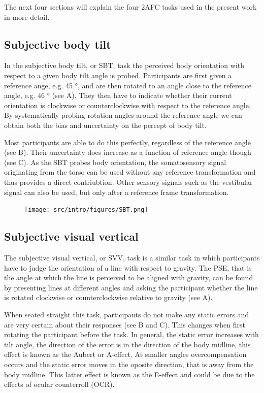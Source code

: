 The next four sections will explain the four 2AFC tasks used in the present work in more detail.

\subsection{Subjective body tilt}
In the subjective body tilt, or SBT, task the perceived body orientation with respect to a given body tilt angle is probed. Participants are first given a reference ange, e.g. 45 \si{\degree}, and are then rotated to an angle close to the reference angle, e.g. 46 \si{\degree} (see A). They then have to indicate whether their current orientation is clockwise or counterclockwise with respect to the reference angle. By systematically probing rotation angles around the reference angle we can obtain both the bias and uncertainty on the percept of body tilt.

Most participants are able to do this perfectly, regardless of the reference angle (see B). Their uncertainty does increase as a function of reference angle though (see C).
As the SBT probes body orientation, the somatosensory signal originating from the torso can be used without any reference transformation and thus provides a direct contriubtion. Other sensory signals such as the vestibular signal can also be used, but only after a reference frame transformation.

\begin{figure}
    \texttt{[image: src/intro/figures/SBT.png]}

    \caption{}
    \label{intro:fig4}
\end{figure}


\subsection{Subjective visual vertical}
The subjective visual vertical, or SVV, task is a similar task in which participants have to judge the orientation of a line with respect to gravity. The PSE, that is the angle at which the line is perceived to be aligned with gravity, can be found by presenting lines at different angles and asking the participant whether the line is rotated clockwise or counterclockwise relative to gravity (see A).

When seated straight this task, participants do not make any static errors and are very certain about their responses (see B and C). This changes when first rotating the participant before the task. In general, the static error increases with tilt angle, the direction of the error is in the direction of the body midline, this effect is known as the Aubert or A-effect. At smaller angles overcompensation occurs and the static error moves in the oposite direction, that is away from the body midline. This latter effect is known as the E-effect and could be due to the effects of ocular counterroll (OCR).

